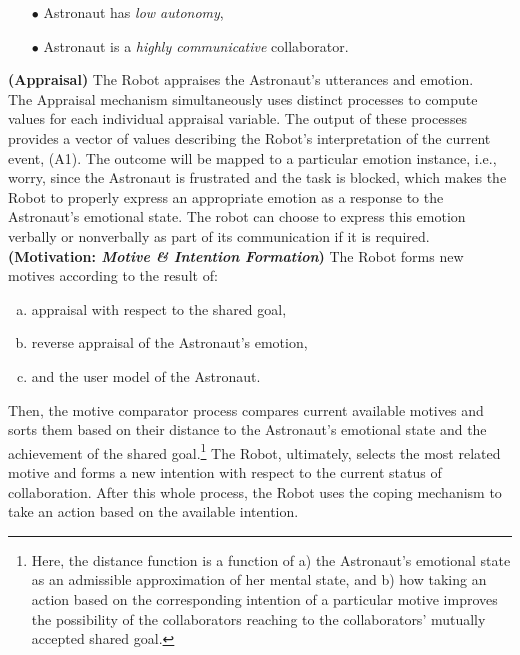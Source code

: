 \begin{itemize}
  \item[$\bullet$] Astronaut has \textit{low autonomy},
  \item[$\bullet$] Astronaut is a \textit{highly communicative} collaborator.
\end{itemize}

\noindent \textbf{(Appraisal)} The Robot appraises the Astronaut's utterances
and emotion.\\

The Appraisal mechanism simultaneously uses distinct processes to compute values
for each individual appraisal variable. The output of these processes provides a
vector of values describing the Robot's interpretation of the current event,
(A1). The outcome will be mapped to a particular emotion instance, i.e., worry,
since the Astronaut is frustrated and the task is blocked, which makes the Robot
to properly express an appropriate emotion as a response to the Astronaut's
emotional state. The robot can choose to express this emotion verbally or
nonverbally as part of its communication if it is required.\\

\noindent \textbf{(Motivation: \textit{Motive \& Intention Formation})}
The Robot forms new motives according to the result of:

\begin{enumerate}[a)]
  \item appraisal with respect to the shared goal,
  \item reverse appraisal of the Astronaut's emotion,
  \item and the user model of the Astronaut. 
\end{enumerate}

Then, the motive comparator process compares current available motives and
sorts them based on their distance to the Astronaut's emotional state and
the achievement of the shared goal.\footnote{Here, the distance function is a
function of a) the Astronaut's emotional state as an admissible approximation
of her mental state, and b) how taking an action based on the corresponding
intention of a particular motive improves the possibility of the collaborators
reaching to the collaborators' mutually accepted shared goal.} The Robot,
ultimately, selects the most related motive and forms a new intention with
respect to the current status of collaboration. After this whole process, the
Robot uses the coping mechanism to take an action based on the available
intention.\\

